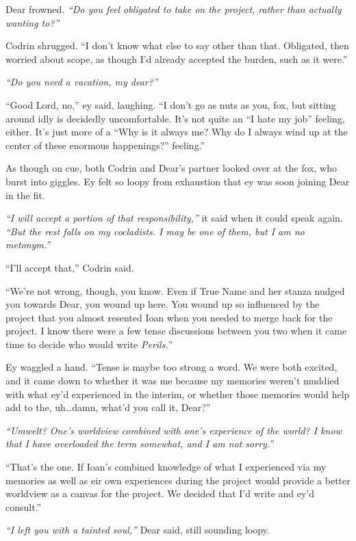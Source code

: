 Dear frowned. \emph{``Do you feel obligated to take on the project, rather than actually wanting to?''}

Codrin shrugged. ``I don't know what else to say other than that. Obligated, then worried about scope, as though I'd already accepted the burden, such as it were.''

\emph{``Do you need a vacation, my dear?''}

``Good Lord, no,'' ey said, laughing. ``I don't go as nuts as you, fox, but sitting around idly is decidedly uncomfortable. It's not quite an ``I hate my job'' feeling, either. It's just more of a ``Why is it always me? Why do I always wind up at the center of these enormous happenings?'' feeling.''

As though on cue, both Codrin and Dear's partner looked over at the fox, who burst into giggles. Ey felt so loopy from exhaustion that ey was soon joining Dear in the fit.

\emph{``I will accept a portion of that responsibility,''} it said when it could speak again. \emph{``But the rest falls on my cocladists. I may be one of them, but I am no metonym.''}

``I'll accept that,'' Codrin said.

``We're not wrong, though, you know. Even if True Name and her stanza nudged you towards Dear, you wound up here. You wound up so influenced by the project that you almost resented Ioan when you needed to merge back for the project. I know there were a few tense discussions between you two when it came time to decide who would write \emph{Perils.}''

Ey waggled a hand. ``Tense is maybe too strong a word. We were both excited, and it came down to whether it was me because my memories weren't muddied with what ey'd experienced in the interim, or whether those memories would help add to the, uh\ldots damn, what'd you call it, Dear?''

\emph{``\emph{Umwelt}? One's worldview combined with one's experience of the world? I know that I have overloaded the term somewhat, and I am not sorry.''}

``That's the one. If Ioan's combined knowledge of what I experienced via my memories as well as eir own experiences during the project would provide a better worldview as a canvas for the project. We decided that I'd write and ey'd consult.''

\emph{``I left you with a tainted soul,''} Dear said, still sounding loopy.

